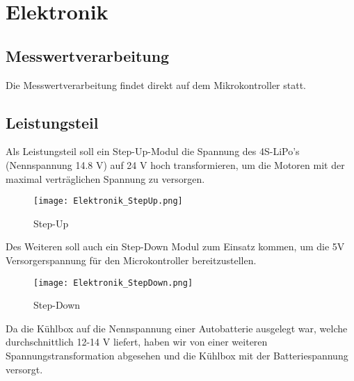 \section{Elektronik}

\subsection{Messwertverarbeitung}
Die Messwertverarbeitung findet direkt auf dem Mikrokontroller statt.

\subsection{Leistungsteil}
Als Leistungsteil soll ein Step-Up-Modul die Spannung des 4S-LiPo’s (Nennspannung 14.8 V) auf 24 V hoch transformieren, um die Motoren mit der maximal verträglichen Spannung zu versorgen. 

\begin{figure}[H]
    \begin{center}
    \texttt{[image: Elektronik\_StepUp.png]}
    \end{center}
    \caption{Step-Up}
\end{figure}

Des Weiteren soll auch ein Step-Down Modul zum Einsatz kommen, um die 5V Versorgerspannung für den Microkontroller bereitzustellen. 

\begin{figure}[H]
    \begin{center}
    \texttt{[image: Elektronik\_StepDown.png]}
    \end{center}
    \caption{Step-Down}
\end{figure}

Da die Kühlbox auf die Nennspannung einer Autobatterie ausgelegt war, welche durchschnittlich 12-14 V liefert, haben wir von einer weiteren Spannungstransformation abgesehen und die Kühlbox mit der Batteriespannung versorgt.
